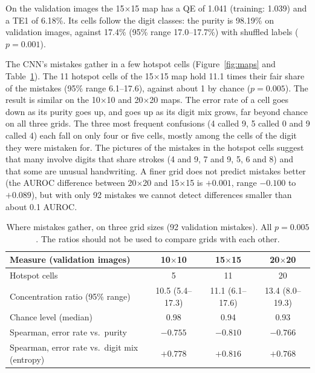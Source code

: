 \documentclass[11pt]{article}
\begin{document}
On the validation images the 15$\times$15 map has a QE of 1.041 (training: 1.039) and a TE1 of 6.18\%. Its cells follow the digit classes: the purity is 98.19\% on validation images, against 17.4\% (95\% range 17.0--17.7\%) with shuffled labels ($p=0.001$).

The CNN's mistakes gather in a few hotspot cells (Figure~\ref{fig:maps} and Table~\ref{tab:phase2}). The 11 hotspot cells of the 15$\times$15 map hold 11.1 times their fair share of the mistakes (95\% range 6.1--17.6), against about 1 by chance ($p=0.005$).
The result is similar on the 10$\times$10 and 20$\times$20 maps. The error rate of a cell goes down as its purity goes up, and goes up as its digit mix grows, far beyond chance on all three grids.
The three most frequent confusions (4 called 9, 5 called 0 and 9 called 4) each fall on only four or five cells, mostly among the cells of the digit they were mistaken for. The pictures of the mistakes in the hotspot cells suggest that many involve digits that share strokes (4 and 9, 7 and 9, 5, 6 and 8) and that some are unusual handwriting.
A finer grid does not predict mistakes better (the AUROC difference between 20$\times$20 and 15$\times$15 is $+0.001$, range $-0.100$ to $+0.089$), but with only 92 mistakes we cannot detect differences smaller than about 0.1 AUROC.

\begin{table}[H]
\centering
\renewcommand{\arraystretch}{1.12}
\small
\begin{tabular}{|l|c|c|c|}
\hline
\textbf{Measure (validation images)} & \textbf{10$\times$10} & \textbf{15$\times$15} & \textbf{20$\times$20} \\ \hline
Hotspot cells & 5 & 11 & 20 \\ \hline
Concentration ratio (95\% range) & 10.5 (5.4--17.3) & 11.1 (6.1--17.6) & 13.4 (8.0--19.3) \\ \hline
Chance level (median) & 0.98 & 0.94 & 0.93 \\ \hline
Spearman, error rate vs.\ purity & $-0.755$ & $-0.810$ & $-0.766$ \\ \hline
Spearman, error rate vs.\ digit mix (entropy) & $+0.778$ & $+0.816$ & $+0.768$ \\ \hline
\end{tabular}
\caption{Where mistakes gather, on three grid sizes (92 validation mistakes). All $p=0.005$. The ratios should not be used to compare grids with each other.}
\label{tab:phase2}
\end{table}
\end{document}
